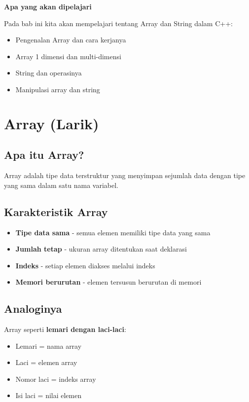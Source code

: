 \textbf{Apa yang akan dipelajari}

Pada bab ini kita akan mempelajari tentang Array dan String dalam C++:

\begin{itemize}
\item Pengenalan Array dan cara kerjanya
\item Array 1 dimensi dan multi-dimensi
\item String dan operasinya
\item Manipulasi array dan string
\end{itemize}

\minitoc

\section{Array (Larik)}\label{array}

\subsection{Apa itu Array?}

Array adalah tipe data terstruktur yang menyimpan sejumlah data dengan tipe yang sama dalam satu nama variabel.

\subsection{Karakteristik Array}

\begin{itemize}
\item \textbf{Tipe data sama} - semua elemen memiliki tipe data yang sama
\item \textbf{Jumlah tetap} - ukuran array ditentukan saat deklarasi
\item \textbf{Indeks} - setiap elemen diakses melalui indeks
\item \textbf{Memori berurutan} - elemen tersusun berurutan di memori
\end{itemize}

\subsection{Analoginya}

Array seperti \textbf{lemari dengan laci-laci}:
\begin{itemize}
\item Lemari = nama array
\item Laci = elemen array
\item Nomor laci = indeks array
\item Isi laci = nilai elemen
\end{itemize}


